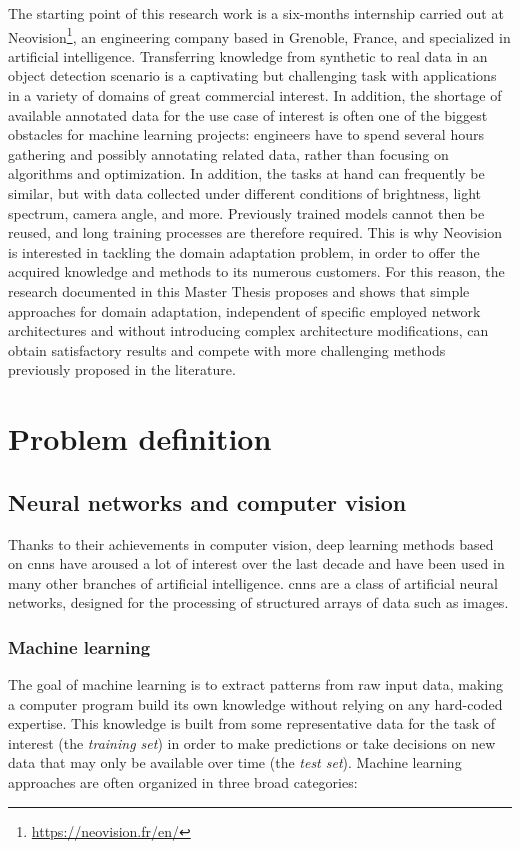 \documentclass[%
    corpo=12pt,
    twoside,
    stile=classica,   
    tipotesi=magistrale,
    evenboxes,
    english,
	numerazioneromana,
]{toptesi}
\begin{document}
\bigskip
The starting point of this research work is a six-months internship carried out at Neovision\footnote{\url{https://neovision.fr/en/}}, an engineering company based in Grenoble, France, and specialized in artificial intelligence. Transferring knowledge from synthetic to real data in an object detection scenario is a captivating but challenging task with applications in a variety of domains of great commercial interest. In addition, the shortage of available annotated data for the use case of interest is often one of the biggest obstacles for machine learning projects: engineers have to spend several hours gathering and possibly annotating related data, rather than focusing on algorithms and optimization. In addition, the tasks at hand can frequently be similar, but with data collected under different conditions of brightness, light spectrum, camera angle, and more. Previously trained models cannot then be reused, and long training processes are therefore required. This is why Neovision is interested in tackling the domain adaptation problem, in order to offer the acquired knowledge and methods to its numerous customers. For this reason, the research documented in this Master Thesis proposes and shows that simple approaches for domain adaptation, independent of specific employed network architectures and without introducing complex architecture modifications, can obtain satisfactory results and compete with more challenging methods previously proposed in the literature.


\chapter{Problem definition}
\section{Neural networks and computer vision}
Thanks to their achievements in computer vision, deep learning methods based on \glspl{cnn} have aroused a lot of interest over the last decade and have been used in many other branches of artificial intelligence. \Glspl{cnn} are a class of artificial neural networks, designed for the processing of structured arrays of data such as images.

\subsection{Machine learning}
The goal of machine learning is to extract patterns from raw input data, making a computer program build its own knowledge without relying on any hard-coded expertise. This knowledge is built from some representative data for the task of interest (the \textit{training set}) in order to make predictions or take decisions on new data that may only be available over time (the \textit{test set}). Machine learning approaches are often organized in three broad categories:
\end{document}
